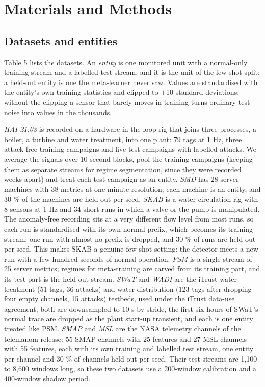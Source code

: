 \hypertarget{materials-and-methods}{%
\section{Materials and Methods}\label{materials-and-methods}}

\hypertarget{datasets-and-entities}{%
\subsection{Datasets and entities}\label{datasets-and-entities}}

Table 5 lists the datasets. An \emph{entity} is one monitored unit with a normal-only training stream and a labelled test stream, and it is the unit of the few-shot split: a held-out entity is one the meta-learner never saw. Values are standardised with the entity's own training statistics and clipped to \ensuremath{\pm}10 standard deviations; without the clipping a sensor that barely moves in training turns ordinary test noise into values in the thousands.

\emph{HAI 21.03} \citep{shin2021hai} is recorded on a hardware-in-the-loop rig that joins three processes, a boiler, a turbine and water treatment, into one plant: 79 tags at 1 Hz, three attack-free training campaigns and five test campaigns with labelled attacks. We average the signals over 10-second blocks, pool the training campaigns (keeping them as separate streams for regime segmentation, since they were recorded weeks apart) and treat each test campaign as an entity. \emph{SMD} \citep{su2019omnianomaly} has 28 server machines with 38 metrics at one-minute resolution; each machine is an entity, and 30 \% of the machines are held out per seed. \emph{SKAB} \citep{katser2020skab} is a water-circulation rig with 8 sensors at 1 Hz and 34 short runs in which a valve or the pump is manipulated. The anomaly-free recording sits at a very different flow level from most runs, so each run is standardised with its own normal prefix, which becomes its training stream; one run with almost no prefix is dropped, and 30 \% of runs are held out per seed. This makes SKAB a genuine few-shot setting: the detector meets a new run with a few hundred seconds of normal operation. \emph{PSM} \citep{abdulaal2021psm} is a single stream of 25 server metrics; regimes for meta-training are carved from its training part, and its test part is the held-out stream. \emph{SWaT} \citep{goh2016swat} and \emph{WADI} \citep{ahmed2017wadi} are the iTrust water-treatment (51 tags, 36 attacks) and water-distribution (123 tags after dropping four empty channels, 15 attacks) testbeds, used under the iTrust data-use agreement; both are downsampled to 10 s by stride, the first six hours of SWaT's normal trace are dropped as the plant start-up transient, and each is one entity treated like PSM. \emph{SMAP} and \emph{MSL} \citep{hundman2018smap} are the NASA telemetry channels of the telemanom release: 55 SMAP channels with 25 features and 27 MSL channels with 55 features, each with its own training and labelled test stream, one entity per channel and 30 \% of channels held out per seed. Their test streams are 1,100 to 8,600 windows long, so these two datasets use a 200-window calibration and a 400-window shadow period.

